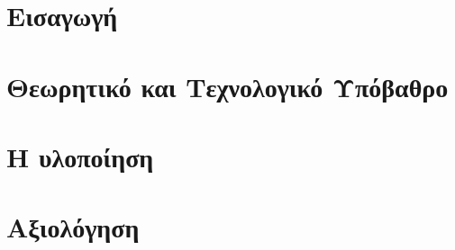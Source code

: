 \documentclass[hidelinks,a4paper,11pt,twoside]{book}
\author{\nomme}
\begin{document}
\setcounter{page}{3}







\clearemptydoublepage








% 

\clearemptydoublepage



\clearemptydoublepage



\clearemptydoublepage



\clearemptydoublepage

\pagestyle{fancy}

\tableofcontents
\clearemptydoublepage
\listoffigures
\clearemptydoublepage
\listoftables
\clearemptydoublepage


\setcounter{page}{1}

\mainmatter
\chapter{Εισαγωγή}\label{ch:introduction}

\clearemptydoublepage

\chapter{Θεωρητικό και Τεχνολογικό Υπόβαθρο}\label{ch:technicalAndTheoreticalBg}

\clearemptydoublepage

\chapter{Η υλοποίηση}\label{ch:implementation}

\clearemptydoublepage

\chapter{Αξιολόγηση}\label{ch:experiment}

\clearemptydoublepage
\end{document}
